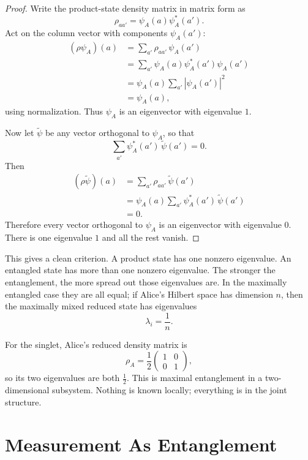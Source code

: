 \begin{proof}
Write the product-state density matrix in matrix form as
\begin{equation}
\rho_{aa'}=\psi_A(a)\psi_A^*(a').
\end{equation}
Act on the column vector with components $\psi_A(a')$:
\begin{align}
(\rho \psi_A)(a)
&=\sum_{a'} \rho_{aa'}\,\psi_A(a') \\
&=\sum_{a'} \psi_A(a)\psi_A^*(a')\psi_A(a') \\
&=\psi_A(a)\sum_{a'} |\psi_A(a')|^2 \\
&=\psi_A(a),
\end{align}
using normalization. Thus $\psi_A$ is an eigenvector with eigenvalue $1$.

Now let $\widetilde{\psi}$ be any vector orthogonal to $\psi_A$, so that
\[
\sum_{a'} \psi_A^*(a')\,\widetilde{\psi}(a')=0.
\]
Then
\begin{align}
(\rho \widetilde{\psi})(a)
&=\sum_{a'} \rho_{aa'}\,\widetilde{\psi}(a') \\
&=\psi_A(a)\sum_{a'}\psi_A^*(a')\,\widetilde{\psi}(a') \\
&=0.
\end{align}
Therefore every vector orthogonal to $\psi_A$ is an eigenvector with eigenvalue $0$. There is one eigenvalue $1$ and all the rest vanish.
\end{proof}

This gives a clean criterion. A product state has one nonzero eigenvalue. An entangled state has more than one nonzero eigenvalue. The stronger the entanglement, the more spread out those eigenvalues are. In the maximally entangled case they are all equal; if Alice's Hilbert space has dimension $n$, then the maximally mixed reduced state has eigenvalues
\begin{equation}
\lambda_i=\frac{1}{n}.
\end{equation}

For the singlet, Alice's reduced density matrix is
\begin{equation}
\rho_A=\frac12
\begin{pmatrix}
1 & 0 \\
0 & 1
\end{pmatrix},
\end{equation}
so its two eigenvalues are both $\frac12$. This is maximal entanglement in a two-dimensional subsystem. Nothing is known locally; everything is in the joint structure.

\section{Measurement As Entanglement}

